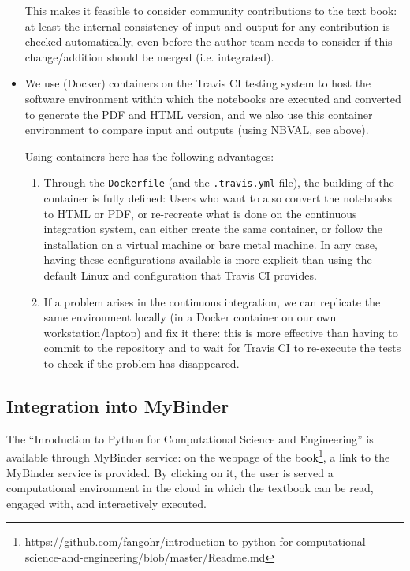 \documentclass{deliverablereport}
\begin{document}
\begin{itemize}
  This makes it feasible to consider community contributions to the
  text book: at least the internal consistency of input and output for
  any contribution is checked automatically, even before the author
  team needs to consider if this change/addition should be merged
  (i.e. integrated).

\item We use (Docker) containers on the Travis CI testing system to
  host the software environment within which the notebooks are
  executed and converted to generate the PDF and HTML version, and we
  also use this container environment to compare input and outputs
  (using NBVAL, see above).

  Using containers here has the following advantages:
  \begin{enumerate}
  \item Through the \texttt{Dockerfile} (and the \texttt{.travis.yml}
    file), the building of the container is fully defined: Users who
    want to also convert the notebooks to HTML or PDF, or re-recreate
    what is done on the continuous integration system, can either
    create the same container, or follow the installation on a virtual
    machine or bare metal machine. In any case, having these
    configurations available is more explicit than using the default
    Linux and configuration that Travis CI provides.

  \item If a problem arises in the continuous integration, we can
    replicate the same environment locally (in a Docker container on
    our own workstation/laptop) and fix it there: this is more
    effective than having to commit to the repository and to wait for
    Travis CI to re-execute the tests to check if the problem has
    disappeared.

  \end{enumerate}

\end{itemize}

\subsection{Integration into MyBinder}
The ``Inroduction to Python for Computational Science and Engineering'' is
available through MyBinder service: on the webpage of the
book\footnote{https://github.com/fangohr/introduction-to-python-for-computational-science-and-engineering/blob/master/Readme.md},
a link to the MyBinder service is provided. By clicking on it, the
user is served a computational environment in the cloud in which the
textbook can be read, engaged with, and interactively executed.
\end{document}
